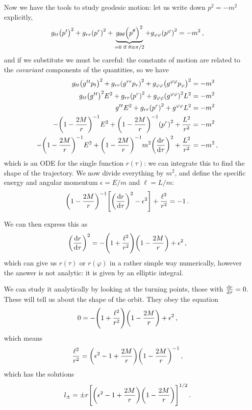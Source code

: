 \documentclass[main.tex]{subfiles}
\begin{document}
Now we have the tools to study geodesic motion: let us write down \(p^2 = -m^2\) explicitly, 
%
\begin{align}
g_{tt} \qty(p^{t})^2 + g_{rr} \qty(p^{r})^2 + \underbrace{g_{\theta \theta } \qty(p^{\theta })^2}_{= 0 \text{ if } \theta \equiv \pi /2} + g_{\varphi \varphi } \qty(p^{\varphi })^2 = - m^2
\,,
\end{align}
%
and if we substitute we must be careful: the constants of motion are related to the \emph{covariant} components of the quantities, so we have 
%
\begin{align}
g_{tt} \qty(g^{tt} p_t)^2 
+ g_{rr} \qty(g^{rr} p_r)^2
+ g_{\varphi \varphi } \qty(g^{\varphi \varphi } p_\varphi )^2
&= - m^2 \\
g_{tt} \qty(g^{tt})^2 E^2 
+ g_{rr} \qty(p^{r})^2
+ g_{\varphi \varphi } \qty(g^{\varphi \varphi })^2 L^2
&= - m^2 \\
 g^{tt} E^2 
+ g_{rr} \qty( p^r)^2
+ g^{\varphi \varphi } L^2
&= - m^2 \\
 -\qty(1 - \frac{2M}{r})^{-1} E^2 
+ \qty(1 - \frac{2M}{r})^{-1} \qty( p^r)^2
+ \frac{L^2}{r^2}
&= - m^2 \\
 -\qty(1 - \frac{2M}{r})^{-1} E^2 
+ \qty(1 - \frac{2M}{r})^{-1} m^2\qty(\dv{r}{\tau })^2
+ \frac{L^2}{r^2}
&= - m^2 
\,,
\end{align}
%
which is an ODE for the single function \(r (\tau )\): we can integrate this to find the shape of the trajectory. 
We now divide everything by \(m^2\), and define the specific energy and angular momentum \(\epsilon = E / m\) and \(\ell = L / m\): 
%
\begin{align}
\qty(1 - \frac{2M}{r})^{-1} \qty[\qty(\dv{r}{\tau })^2 - \epsilon^2]
+ \frac{\ell^2}{r^2} = -1
\,.
\end{align}

We can then express this as 
%
\begin{align}
\qty(\dv{r}{\tau })^2 = - \qty(1 + \frac{\ell^2}{r^2}) \qty(1 - \frac{2M}{r}) + \epsilon^2
\,,
\end{align}
%
which can give us \(r(\tau )\) or \(r(\varphi )\) in a rather simple way numerically, however the answer is not analytic: it is given by an elliptic integral. 

We can study it analytically by looking at the turning points, those with \(\dv{r}{\tau } = 0\).
These will tell us about the shape of the orbit. 
They obey the equation 
%
\begin{align}
0 = - \qty(1 + \frac{\ell^2}{r^2}) \qty(1 - \frac{2M}{r}) + \epsilon^2
\,,
\end{align}
%
which means 
%
\begin{align}
\frac{\ell^2}{r^2} = \qty(\epsilon^2 -1 + \frac{2M}{r}) \qty(1 - \frac{2M}{r})^{-1}
\,,
\end{align}
%
which has the solutions 
%
\begin{align}
l_{\pm} = \pm r \qty[ \qty(\epsilon^2 - 1 + \frac{2M}{r}) \qty(1 - \frac{2M}{r})]^{1/2}
\,.
\end{align}
\end{document}
